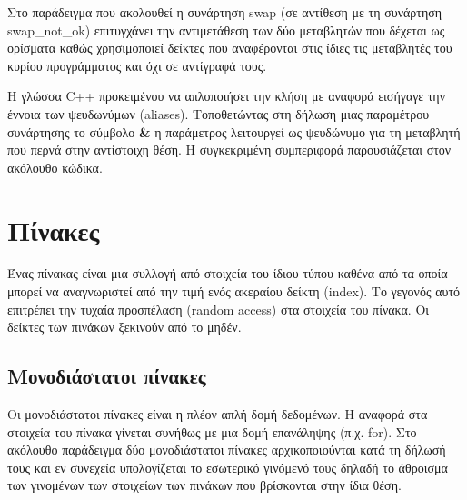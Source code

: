 Στο παράδειγμα που ακολουθεί η συνάρτηση swap (σε αντίθεση με τη συνάρτηση swap\_not\_ok) επιτυγχάνει την αντιμετάθεση των δύο μεταβλητών που δέχεται ως ορίσματα καθώς χρησιμοποιεί δείκτες που αναφέρονται στις ίδιες τις μεταβλητές του κυρίου προγράμματος και όχι σε αντίγραφά τους. 






Η γλώσσα C++ προκειμένου να απλοποιήσει την κλήση με αναφορά εισήγαγε την έννοια των ψευδωνύμων (aliases). Τοποθετώντας στη δήλωση μιας παραμέτρου συνάρτησης το σύμβολο \textbf{\&} η παράμετρος λειτουργεί ως ψευδώνυμο για τη μεταβλητή που περνά στην αντίστοιχη θέση. Η συγκεκριμένη συμπεριφορά παρουσιάζεται στον ακόλουθο κώδικα.






\section{Πίνακες}
Ένας  πίνακας είναι μια συλλογή από στοιχεία του ίδιου τύπου καθένα από τα οποία μπορεί να αναγνωριστεί από την τιμή ενός ακεραίου δείκτη (index).  Το γεγονός αυτό επιτρέπει την τυχαία προσπέλαση (random access) στα στοιχεία του πίνακα. Οι δείκτες των πινάκων ξεκινούν από το μηδέν. 

\subsection{Μονοδιάστατοι πίνακες}
Οι μονοδιάστατοι πίνακες είναι η πλέον απλή δομή δεδομένων. Η αναφορά στα στοιχεία του πίνακα γίνεται συνήθως με μια δομή επανάληψης (π.χ. for). Στο ακόλουθο παράδειγμα δύο μονοδιάστατοι πίνακες αρχικοποιούνται κατά τη δήλωσή τους και εν συνεχεία υπολογίζεται το εσωτερικό γινόμενό τους δηλαδή το άθροισμα των γινομένων των στοιχείων των πινάκων που βρίσκονται στην ίδια θέση.






